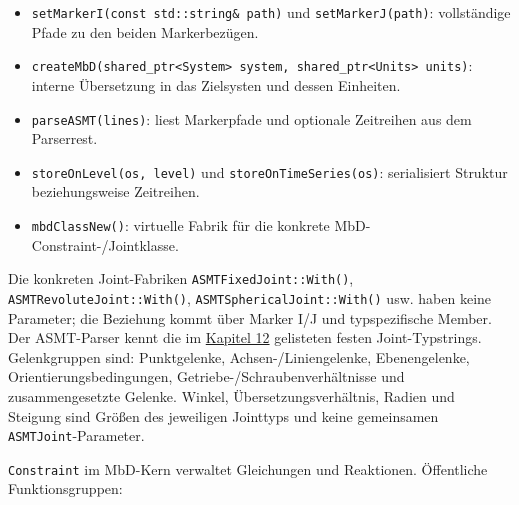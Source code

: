 \documentclass[
  12pt
]{book}
\providecommand{\tightlist}{%
  \setlength{\itemsep}{0pt}\setlength{\parskip}{0pt}}
\begin{document}
\begin{itemize}
\tightlist
\item
  \texttt{setMarkerI(const\ std::string\&\ path)} und
  \texttt{setMarkerJ(path)}: vollständige Pfade zu den beiden
  Markerbezügen.
\item
  \texttt{createMbD(shared\_ptr\textless{}System\textgreater{}\ system,\ shared\_ptr\textless{}Units\textgreater{}\ units)}:
  interne Übersetzung in das Zielsysten und dessen Einheiten.
\item
  \texttt{parseASMT(lines)}: liest Markerpfade und optionale Zeitreihen
  aus dem Parserrest.
\item
  \texttt{storeOnLevel(os,\ level)} und \texttt{storeOnTimeSeries(os)}:
  serialisiert Struktur beziehungsweise Zeitreihen.
\item
  \texttt{mbdClassNew()}: virtuelle Fabrik für die konkrete
  MbD-Constraint-/Jointklasse.
\end{itemize}

Die konkreten Joint-Fabriken \texttt{ASMTFixedJoint::With()},
\texttt{ASMTRevoluteJoint::With()}, \texttt{ASMTSphericalJoint::With()}
usw. haben keine Parameter; die Beziehung kommt über Marker I/J und
typspezifische Member. Der ASMT-Parser kennt die im
\protect\hyperlink{kap-joints}{Kapitel 12} gelisteten festen
Joint-Typstrings. Gelenkgruppen sind: Punktgelenke,
Achsen-/Liniengelenke, Ebenengelenke, Orientierungsbedingungen,
Getriebe-/Schraubenverhältnisse und zusammengesetzte Gelenke. Winkel,
Übersetzungsverhältnis, Radien und Steigung sind Größen des jeweiligen
Jointtyps und keine gemeinsamen \texttt{ASMTJoint}-Parameter.

\texttt{Constraint} im MbD-Kern verwaltet Gleichungen und Reaktionen.
Öffentliche Funktionsgruppen:
\end{document}
